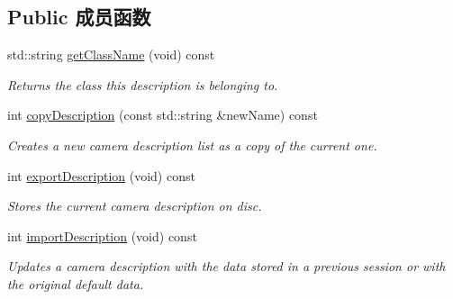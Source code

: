 \subsection*{Public 成员函数}
\begin{DoxyCompactItemize}
\item 
std\+::string \hyperlink{classmv_i_m_p_a_c_t_1_1acquire_1_1_camera_description_base_a4ba5034e10839da1e3d9cb6e1a95092f}{get\+Class\+Name} (void) const 
\begin{DoxyCompactList}\small\item\em Returns the class this description is belonging to. \end{DoxyCompactList}\item 
int \hyperlink{classmv_i_m_p_a_c_t_1_1acquire_1_1_camera_description_base_ab449bcb1f45d79f311728d22b4e60369}{copy\+Description} (const std\+::string \&new\+Name) const 
\begin{DoxyCompactList}\small\item\em Creates a new camera description list as a copy of the current one. \end{DoxyCompactList}\item 
int \hyperlink{classmv_i_m_p_a_c_t_1_1acquire_1_1_camera_description_base_a75ca8307f89a995695a8331f8a6ba463}{export\+Description} (void) const 
\begin{DoxyCompactList}\small\item\em Stores the current camera description on disc. \end{DoxyCompactList}\item 
int \hyperlink{classmv_i_m_p_a_c_t_1_1acquire_1_1_camera_description_base_aee33a8a6a0e801eae4684dcb2a84c841}{import\+Description} (void) const 
\begin{DoxyCompactList}\small\item\em Updates a camera description with the data stored in a previous session or with the original default data. \end{DoxyCompactList}\end{DoxyCompactItemize}
